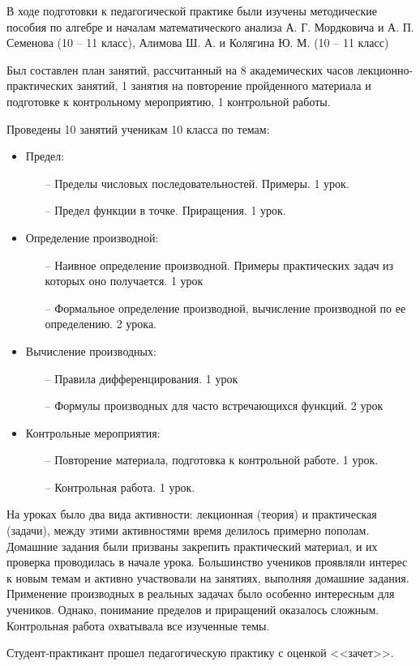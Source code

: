 





В ходе подготовки к педагогической практике были изучены методические пособия по алгебре и началам математического анализа А. Г. Мордковича и А. П. Семенова (10 -- 11 класс), Алимова Ш. А. и Колягина Ю. М. (10 -- 11 класс)

Был составлен план занятий, рассчитанный на 8 академических часов лекционно-практических занятий, 1 занятия на повторение пройденного материала и подготовке к контрольному мероприятию, 1 контрольной работы.

Проведены 10 занятий ученикам 10 класса по темам:
\begin{itemize}
\item Предел:
\begin{itemize}
	\item[--] Пределы числовых последовательностей. Примеры. 1 урок.
	\item[--] Предел функции в точке. Приращения. 1 урок.
\end{itemize}
\item Определение производной:
\begin{itemize}
\item[--] Наивное определение производной. Примеры практических задач из которых оно получается. 1 урок
\item[--] Формальное определение производной, вычисление производной по ее определению. 2 урока.
\end{itemize}
\item Вычисление производных:
\begin{itemize}
\item[--] Правила дифференцирования. 1 урок
\item[--] Формулы производных для часто встречающихся функций. 2 урок
\end{itemize}
\item Контрольные мероприятия:
\begin{itemize}
\item[--] Повторение материала, подготовка к контрольной работе. 1 урок.
\item[--] Контрольная работа. 1 урок.
\end{itemize}
\end{itemize}

На уроках было два вида активности: лекционная (теория) и практическая (задачи), между этими активностями время делилось примерно пополам. Домашние задания были призваны закрепить практический материал, и их проверка проводилась в начале урока. Большинство учеников проявляли интерес к новым темам и активно участвовали на занятиях, выполняя домашние задания. Применение производных в реальных задачах было особенно интересным для учеников. Однако, понимание пределов и приращений оказалось сложным. Контрольная работа охватывала все изученные темы.

Студент-практикант прошел педагогическую практику с оценкой <<зачет>>.

\SignaturesPattern

